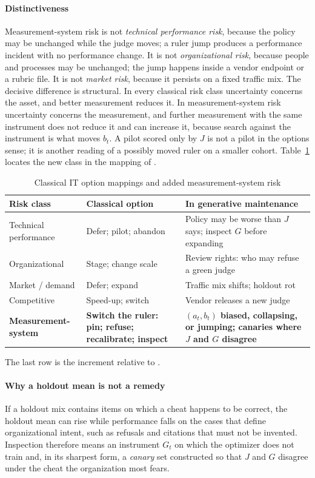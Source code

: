 \documentclass[acmsmall,screen,review]{acmart}
\theoremstyle{acmdefinition}
\begin{document}
\paragraph{Distinctiveness} Measurement-system risk is not \emph{technical performance risk}, because the policy may be unchanged while the judge moves; a ruler jump produces a performance incident with no performance change. It is not \emph{organizational risk}, because people and processes may be unchanged; the jump happens inside a vendor endpoint or a rubric file. It is not \emph{market risk}, because it persists on a fixed traffic mix. The decisive difference is structural. In every classical risk class uncertainty concerns the asset, and better measurement reduces it. In measurement-system risk uncertainty concerns the measurement, and further measurement with the same instrument does not reduce it and can increase it, because search against the instrument is what moves $b_t$. A pilot scored only by $J$ is not a pilot in the options sense; it is another reading of a possibly moved ruler on a smaller cohort. Table~\ref{tab:mapping} locates the new class in the mapping of \citet{benaroch2006}.

\begin{table}[t]
\caption{Classical IT option mappings and added measurement-system risk}\label{tab:mapping}
\small
\begin{tabular}{@{}p{3.2cm}p{4.0cm}p{5.6cm}@{}}
\toprule
Risk class & Classical option & In generative maintenance \\
\midrule
Technical performance & Defer; pilot; abandon & Policy may be worse than $J$ says; inspect $G$ before expanding \\
Organizational & Stage; change scale & Review rights: who may refuse a green judge \\
Market / demand & Defer; expand & Traffic mix shifts; holdout rot \\
Competitive & Speed-up; switch & Vendor releases a new judge \\
\textbf{Measurement-system} & \textbf{Switch the ruler: pin; refuse; recalibrate; inspect} & \textbf{$(a_t,b_t)$ biased, collapsing, or jumping; canaries where $J$ and $G$ disagree} \\
\bottomrule
\end{tabular}
\par\smallskip\footnotesize The last row is the increment relative to \citet{benaroch2006}.
\end{table}

\paragraph{Why a holdout mean is not a remedy} If a holdout mix contains items on which a cheat happens to be correct, the holdout mean can rise while performance falls on the cases that define organizational intent, such as refusals and citations that must not be invented. Inspection therefore means an instrument $G_t$ on which the optimizer does not train and, in its sharpest form, a \emph{canary} set constructed so that $J$ and $G$ disagree under the cheat the organization most fears.
\end{document}
